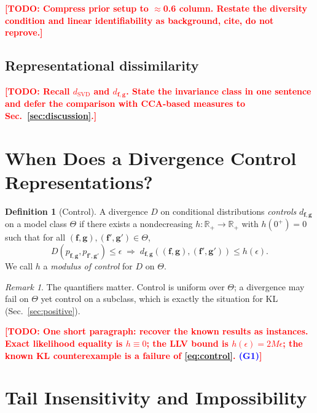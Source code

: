 \documentclass{article}
\newcommand{\TODO}[1]{\textcolor{red}{\textbf{[TODO: #1]}}}
\newcommand{\GATE}[1]{\textcolor{blue}{\textsf{\small (#1)}}}
\newcommand{\bff}{\mathbf{f}}
\newcommand{\bfg}{\mathbf{g}}
\newcommand{\dSVD}{d_{\mathrm{SVD}}}
\newcommand{\dfg}{d_{\bff,\bfg}}
\theoremstyle{plain}
\theoremstyle{definition}
\newtheorem{definition}[theorem]{Definition}
\theoremstyle{remark}
\newtheorem{remark}[theorem]{Remark}
\begin{document}
\TODO{Compress prior setup to $\approx$0.6 column. Restate the diversity
condition and linear identifiability as background, cite, do not reprove.}

\subsection{Representational dissimilarity}
\label{sec:repdis}

\TODO{Recall $\dSVD$ and $\dfg$. State the invariance class in one sentence and
defer the comparison with CCA-based measures to Sec.~\ref{sec:discussion}.}

\section{When Does a Divergence Control Representations?}
\label{sec:control}

\begin{definition}[Control]
\label{def:control}
A divergence $D$ on conditional distributions \emph{controls} $\dfg$ on a model
class $\Theta$ if there exists a nondecreasing $h:\mathbb{R}_{+}\to\mathbb{R}_{+}$
with $h(0^{+})=0$ such that for all
$(\bff,\bfg),(\bff',\bfg')\in\Theta$,
\begin{equation}
  D\!\left(p_{\bff,\bfg},p_{\bff',\bfg'}\right)\le\epsilon
  \;\Longrightarrow\;
  \dfg\!\left((\bff,\bfg),(\bff',\bfg')\right)\le h(\epsilon).
  \label{eq:control}
\end{equation}
We call $h$ a \emph{modulus of control} for $D$ on $\Theta$.
\end{definition}

\begin{remark}
The quantifiers matter. Control is uniform over $\Theta$; a divergence may fail
on $\Theta$ yet control on a subclass, which is exactly the situation for KL
(Sec.~\ref{sec:positive}).
\end{remark}

\TODO{One short paragraph: recover the known results as instances. Exact
likelihood equality is $h\equiv 0$; the LLV bound is $h(\epsilon)=2M\epsilon$;
the known KL counterexample is a failure of \eqref{eq:control}. \GATE{G1}}

\section{Tail Insensitivity and Impossibility}
\label{sec:negative}
\end{document}
